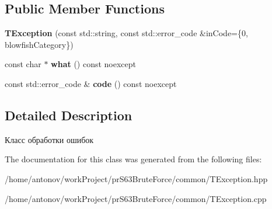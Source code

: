 \subsection*{Public Member Functions}
\begin{DoxyCompactItemize}
\item 
\mbox{\label{classexception_1_1_t_exception_a65fa6e0d911ef56168c7738a61b9e1dd}} 
{\bfseries T\+Exception} (const std\+::string, const std\+::error\+\_\+code \&in\+Code=\{0, blowfish\+Category\})
\item 
\mbox{\label{classexception_1_1_t_exception_a566043ed8dd9aae9043d23cf46cf7b1d}} 
const char $\ast$ {\bfseries what} () const noexcept
\item 
\mbox{\label{classexception_1_1_t_exception_a06a1de480b1738930aff8b21bf134f3e}} 
const std\+::error\+\_\+code \& {\bfseries code} () const noexcept
\end{DoxyCompactItemize}


\subsection{Detailed Description}
Класс обработки ошибок 

The documentation for this class was generated from the following files\+:\begin{DoxyCompactItemize}
\item 
/home/antonov/work\+Project/pr\+S63\+Brute\+Force/common/T\+Exception.\+hpp\item 
/home/antonov/work\+Project/pr\+S63\+Brute\+Force/common/T\+Exception.\+cpp\end{DoxyCompactItemize}
